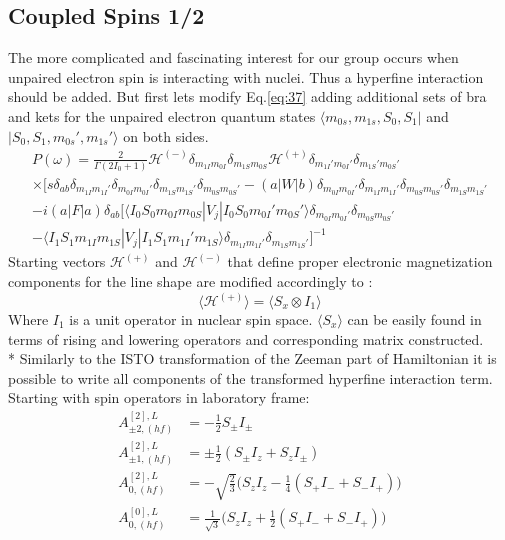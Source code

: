 \subsection{Coupled Spins 1/2}\label{05coupledspinsection}
The more complicated and fascinating interest for our group occurs when unpaired electron spin is interacting with nuclei. Thus a hyperfine interaction should be added. But first lets modify Eq.\ref{eq:37} adding additional sets of bra and kets for the unpaired electron quantum states $\langle m_{0s},m_{1s},S_0,S_1|$ and $|S_0,S_1,m_{0s}',m_{1s}'\rangle$ on both sides.  
\begin{multline}\label{eq:newbras}
P(\omega)=
\frac{2}{\Gamma(2I_0+1)}\mathcal{H}^{(-)}\delta_{m_{1I}m_{0I}}\delta_{m_{1S}m_{0S}}\mathcal{H}^{(+)}\delta_{m_{1I}'m_{0I}'}\delta_{m_{1S}'m_{0S}'} \\ \times[s\delta_{ab}\delta_{m_{1I}m_{1I}'}\delta_{m_{0I}m_{0I}'}\delta_{m_{1S}m_{1S}'}\delta_{m_{0S}m_{0S}'}-(a|W|b)\delta_{m_{0I}m_{0I}'}\delta_{m_{1I}m_{1I}'}\delta_{m_{0S}m_{0S}'}\delta_{m_{1S}m_{1S}'} \\ -i(a|F|a)\delta_{ab}[\langle I_0S_0m_{0I}m_{0S}|V_j|I_0S_0m_{0I}'m_{0S}'\rangle \delta_{m_{0I}m_{0I}'}\delta_{m_{0S}m_{0S}'}\\-\langle I_1S_1m_{1I}m_{1S}|V_j|I_1S_1m_{1I}'m_{1S}\rangle\delta_{m_{1I}m_{1I}'}\delta_{m_{1S}m_{1S}'}]^{-1}
\end{multline} 
Starting vectors $\mathcal{H}^{(+)}$ and $\mathcal{H}^{(-)}$ that define proper electronic magnetization components for the line shape are modified accordingly to \cite{bmr}: 
\begin{equation}
\langle \mathcal{H}^{(+)} \rangle=\langle S_x\otimes I_1 \rangle
\end{equation}
Where $I_1$ is a unit operator in nuclear spin space. $\langle S_x\rangle$ can be easily found in terms of rising and lowering operators and corresponding matrix constructed. \\*
Similarly to the ISTO transformation of the Zeeman part of Hamiltonian it is possible to write all components of the transformed hyperfine interaction term. Starting with spin operators in laboratory frame:   
\begin{subequations}\label{eq:hyperA}
\begin{align}
A^{[2],L}_{\pm2,(hf)} & =-\frac{1}{2}S_{\pm}I_{\pm}\\
A^{[2],L}_{\pm1,(hf)} & =\pm\frac{1}{2}(S_{\pm}I_{z}+S_zI_{\pm})\\
A^{[2],L}_{0,(hf)} & =-\sqrt{\frac{2}{3}}\big(S_{z}I_{z}-\frac{1}{4}(S_+I_-+S_-I_+)\big)\\
A^{[0],L}_{0,(hf)} & =\frac{1}{\sqrt{3}}\big(S_{z}I_{z}+\frac{1}{2}(S_+I_-+S_-I_+)\big)
\end{align}
\end{subequations}
